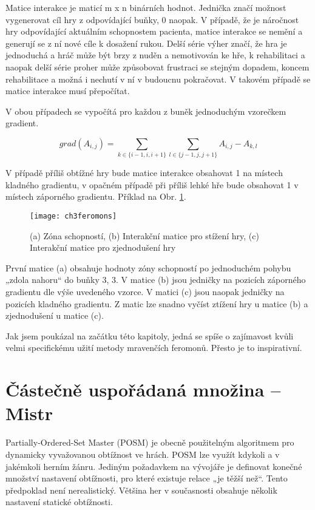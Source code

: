 Matice interakce je maticí m x n binárních hodnot. Jednička značí možnost vygenerovat cíl hry z odpovídající buňky, 0 naopak. V případě, že je náročnost hry odpovídající aktuálním schopnostem pacienta, matice interakce se nemění a generují se z ní nové cíle k dosažení rukou. Delší série výher značí, že hra je jednoduchá a hráč může být brzy z nuděn a nemotivován ke hře, k rehabilitaci a naopak delší série proher může způsobovat frustraci se stejným dopadem, koncem rehabilitace a možná i nechutí v ní v budoucnu pokračovat. V takovém případě se matice interakce musí přepočítat.

V obou případech se vypočítá pro každou z buněk jednoduchým vzorečkem gradient.

\begin{equation}
	grad(A_{i,j}) = \sum_{k \in \{i-1, i, i+1\}} \sum_{l \in \{j-1, j, j+1\}} A_{i, j} - A_{k, l}
\end{equation}

V případě příliš obtížné hry bude matice interakce obsahovat 1 na místech kladného gradientu, v opačném případě při příliš lehké hře bude obsahovat 1 v místech záporného gradientu. Příklad na Obr. \ref{fig-ch3feromons}.

\begin{figure}
  \centering
  \texttt{[image: ch3feromons]}
	\caption{(a) Zóna schopností, (b) Interakční matice pro stížení hry, (c) Interakční matice pro zjednodušení hry \cite{26poststroke} }
	\label{fig-ch3feromons}
\end{figure}

První matice (a) obsahuje hodnoty zóny schopností po jednoduchém pohybu „zdola nahoru“ do buňky 3, 3. V matice (b) jsou jedničky na pozicích záporného gradientu dle výše uvedeného vzorce. V matici (c) jsou naopak jedničky na pozicích kladného gradientu. Z matic lze snadno vyčíst ztížení hry u matice (b) a zjednodušení u matice (c).

Jak jsem poukázal na začátku této kapitoly, jedná se spíše o zajímavost kvůli velmi specifickému užití metody mravenčích feromonů. Přesto je to inspirativní.

\section{Částečně uspořádaná množina – Mistr}

Partially-Ordered-Set Master (POSM) \cite{22posm1} je obecně použitelným algoritmem pro dynamicky vyvažovanou obtížnost ve hrách. POSM lze využít kdykoli a v jakémkoli herním žánru. Jediným požadavkem na vývojáře je definovat konečné množství nastavení obtížnosti, pro které existuje relace „je těžší než“. Tento předpoklad není nerealistický. Většina her v současnosti obsahuje několik nastavení statické obtížnosti.

